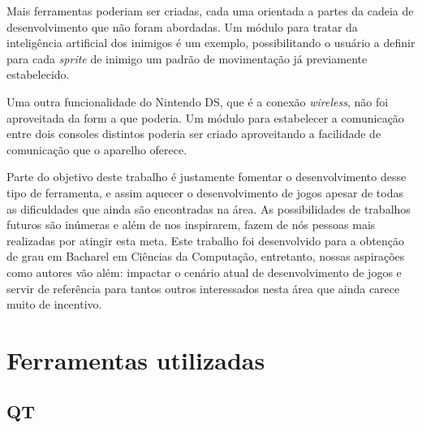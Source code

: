 \documentclass[brazil]{abnt}
\begin{document}
Mais ferramentas poderiam ser criadas, cada uma orientada a partes da cadeia de desenvolvimento que não foram abordadas. Um módulo para tratar da inteligência artificial dos inimigos é um exemplo, possibilitando o usuário a definir para cada \textit{sprite} de inimigo um padrão de movimentação já previamente estabelecido. 

Uma outra funcionalidade do Nintendo DS, que é a conexão \textit{wireless}, não foi aproveitada da form	a que poderia. Um módulo para estabelecer a comunicação entre dois consoles distintos poderia ser criado aproveitando a facilidade de comunicação que o aparelho oferece. 

Parte do objetivo deste trabalho é justamente fomentar o desenvolvimento desse tipo de ferramenta, e assim aquecer o desenvolvimento de jogos apesar de todas as dificuldades que ainda são encontradas na área. As possibilidades de trabalhos futuros são inúmeras e além de nos inspirarem, fazem de nós pessoas mais realizadas por atingir esta meta. Este trabalho foi desenvolvido para a obtenção de grau em Bacharel em Ciências da Computação, entretanto, nossas aspirações como autores vão além: impactar o cenário atual de desenvolvimento de jogos e servir de referência para tantos outros interessados nesta área que ainda carece muito de incentivo.





\anexo

\chapter{Ferramentas utilizadas}

\section{QT}
\end{document}

